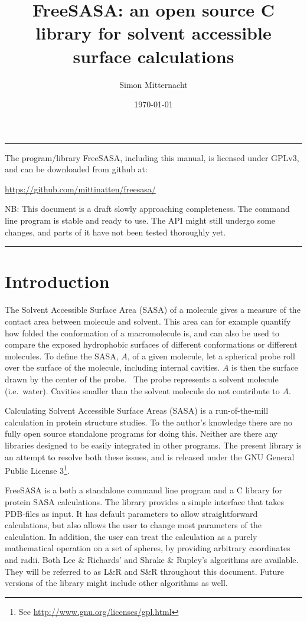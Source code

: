 \documentclass[a4paper,11pt]{article}
\author{Simon Mitternacht}
\date{\today}
\title{FreeSASA: an open source C library for solvent accessible surface
  calculations}
\begin{document}
\maketitle
\hrule\vspace{0.5cm}
\noindent
The program/library FreeSASA, including this manual, is licensed under
GPLv3, and can be downloaded from github at: 
\begin{center}
\url{https://github.com/mittinatten/freesasa/}
\end{center}
NB: This document is a draft slowly approaching completeness. The
command line program is stable and ready to use. The API might
still undergo some changes, and parts of it have not been tested
thoroughly yet.
\vspace{0.5cm} \hrule
\section{Introduction}
The Solvent Accessible Surface Area (SASA) of a molecule gives a
measure of the contact area between molecule and solvent. This
area can for example quantify how folded the conformation of a
macromolecule is, and can also be used to compare the exposed
hydrophobic surfaces of different conformations or different
molecules. To define the SASA, $A$, of a given molecule, let a
spherical probe roll over the surface of the molecule, including
internal cavities. $A$ is then the surface drawn by the center of the
probe.~\cite{LnR} The probe represents a solvent molecule
(i.e.\ water). Cavities smaller than the solvent molecule do not
contribute to $A$.

Calculating Solvent Accessible Surface Areas (SASA) is a
run-of-the-mill calculation in protein structure studies. To the
author's knowledge there are no fully open source standalone programs
for doing this. Neither are there any libraries designed to be easily
integrated in other programs. The present library is an attempt to
resolve both these issues, and is released under the GNU General
Public License 3\footnote{See
  \url{http://www.gnu.org/licenses/gpl.html}}.

FreeSASA is a both a standalone command line program and a C library
for protein SASA calculations. The library provides a simple interface
that takes PDB-files as input. It has default parameters to allow
straightforward calculations, but also allows the user to change most
parameters of the calculation. In addition, the user can treat the
calculation as a purely mathematical operation on a set of spheres, by
providing arbitrary coordinates and radii. Both Lee \& Richards'
\cite{LnR} and Shrake \& Rupley's \cite{SnR} algorithms are
available. They will be referred to as L\&R and S\&R throughout this
document. Future versions of the library might include other
algorithms as well.
\end{document}
